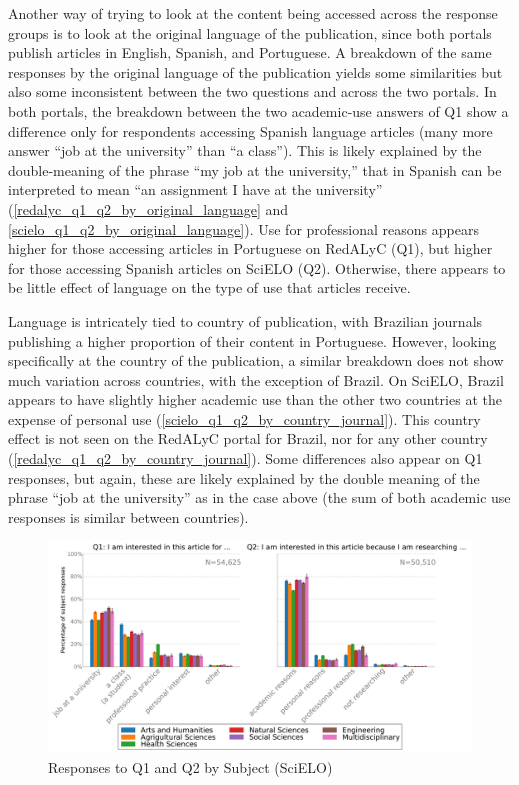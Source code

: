 Another way of trying to look at the content being accessed across the response groups is to look at the original language of the publication, since both portals publish articles in English, Spanish, and Portuguese. A breakdown of the same responses by the original language of the publication yields some similarities but also some inconsistent between the two questions and across the two portals. In both portals, the breakdown between the two academic-use answers of Q1 show a difference only for respondents accessing Spanish language articles (many more answer ``job at the university'' than ``a class''). This is likely explained by the double-meaning of the phrase ``my job at the university,'' that in Spanish can be interpreted to mean ``an assignment I have at the university'' (\autoref{redalyc_q1_q2_by_original_language} and \autoref{scielo_q1_q2_by_original_language}). Use for professional reasons appears higher for those accessing articles in Portuguese on RedALyC (Q1), but higher for those accessing Spanish articles on SciELO (Q2). Otherwise, there appears to be little effect of language on the type of use that articles receive.

Language is intricately tied to country of publication, with Brazilian journals publishing a higher proportion of their content in Portuguese. However, looking specifically at the country of the publication, a similar breakdown does not show much variation across countries, with the exception of Brazil. On SciELO, Brazil appears to have slightly higher academic use than the other two countries at the expense of personal use (\autoref{scielo_q1_q2_by_country_journal}). This country effect is not seen on the RedALyC portal for Brazil, nor for any other country (\autoref{redalyc_q1_q2_by_country_journal}). Some differences also appear on Q1 responses, but again, these are likely explained by the double meaning of the phrase ``job at the university'' as in the case above (the sum of both academic use responses is similar between countries).

\begin{figure}[htbp]
\centering
\includegraphics[keepaspectratio,width=\textwidth,height=0.75\textheight]{figures/scielo_q1_q2_by_latindex_subjects.pdf}
\caption{Responses to Q1 and Q2 by Subject (SciELO)}
\label{scielo_q1_q2_by_latindex_subjects}
\end{figure}

